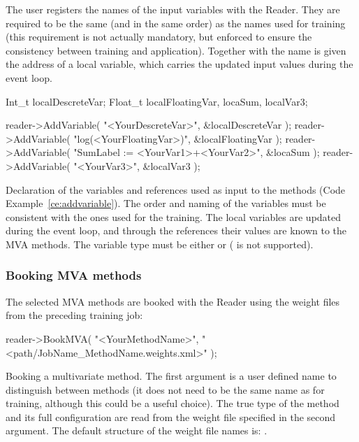 The user registers the names of the input variables with the Reader. They are
required to be the same (and in the same order) as the names used for training 
(this requirement is not actually mandatory, but enforced to ensure the consistency 
between training and application). Together with the name is given the address of a 
local variable, which carries the updated input values during the event loop.
\begin{codeexample}
\begin{tmvacode}
Int_t   localDescreteVar;
Float_t localFloatingVar, locaSum, localVar3;

reader->AddVariable( "<YourDescreteVar>",                 &localDescreteVar );
reader->AddVariable( "log(<YourFloatingVar>)",            &localFloatingVar );
reader->AddVariable( "SumLabel := <YourVar1>+<YourVar2>", &locaSum          );
reader->AddVariable( "<YourVar3>",                        &localVar3        );
\end{tmvacode}
\caption[.]{\codeexampleCaptionSize Declaration of the variables and references 
            used as input to the methods (\cf Code Example~\ref{ce:addvariable}). 
            The order and naming of the variables
            must be consistent with the ones used for the training. The local 
            variables are updated during the event loop, and through the references
            their values are known to the MVA methods. The variable type must be either
             or  ( is not supported). }
\end{codeexample}

\subsubsection{Booking MVA methods}

The selected MVA methods are booked with the Reader using the weight files from the 
preceding training job:
\begin{codeexample}
\begin{tmvacode}
reader->BookMVA( "<YourMethodName>", "<path/JobName_MethodName.weights.xml>" );
\end{tmvacode}
\caption[.]{\codeexampleCaptionSize Booking a multivariate method. The first
            argument is a user defined name to distinguish between  
            methods (it does not need to be the same name as for training, 
            although this could be a useful choice). The true type of the 
            method and its full configuration are read from the weight file
            specified in the second argument. The default structure of the 
            weight file names is: .
}
\end{codeexample}

